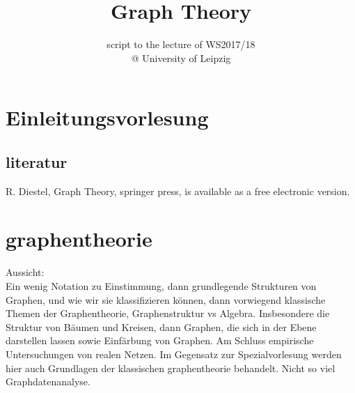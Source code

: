 \documentclass[a4paper]{article}
\title{\textbf{Graph Theory}}
\author{script to the lecture of  WS2017/18 \\
@ University of Leipzig}
\date{}
\theoremstyle{definition}
\theoremstyle{remark}
\begin{document}
\section{Einleitungsvorlesung}
\label{sec:einleitungsvorlesung}
\subsection{literatur}
\label{sub:literatur}
R. Diestel, Graph Theory, springer press, is available as a free electronic version.
\section{graphentheorie}
\label{sec:graphentheorie}
Aussicht:\\
Ein wenig Notation zu Einstimmung, dann grundlegende Strukturen von Graphen, und wie wir sie  klassifizieren können, 
dann vorwiegend klassische Themen der Graphentheorie, Graphenstruktur vs Algebra. Insbesondere die Struktur von Bäumen und Kreisen, dann Graphen, die sich in der Ebene darstellen lassen sowie Einfärbung von Graphen.
Am Schluss empirische Untersuchungen von realen Netzen.
Im Gegensatz zur Spezialvorlesung werden hier auch Grundlagen der klassischen graphentheorie behandelt. Nicht so viel Graphdatenanalyse.
\end{document}
